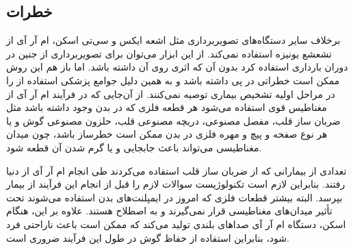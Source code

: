 \subsection{خطرات \mri}
برخلاف سایر دستگاه‌های تصویربرداری مثل اشعه ایکس و سی‌تی اسکن، ام آر آی از تشعشع یونیزه استفاده نمی‌کند. از این ابزار می‌توان برای تصویربرداری از جنین در دوران بارداری استفاده کرد بدون آن که اثری روی آن داشته باشد. اما باز هم این روش ممکن است خطراتی در پی داشته باشد و به همین دلیل جوامع پزشکی استفاده از \mri را در مراحل اولیه تشخیص بیماری توصیه نمی‌کنند. از آن‌جایی که در فرآیند ام آر آی از مغناطیس قوی استفاده می‌شود هر قطعه فلزی که در بدن وجود داشته باشد مثل ضربان ساز قلب، مفصل مصنوعی، دریچه مصنوعی قلب، حلزون مصنوعی گوش و یا هر نوع صفحه و پیچ و مهره فلزی در بدن ممکن است خطرساز باشد، چون میدان مغناطیسی می‌تواند باعث جابجایی و یا گرم شدن آن قطعه شود.

تعدادی از بیمارانی که از ضربان ساز قلب استفاده می‌کردند طی انجام ام آر آی از دنیا رفتند. بنابراین لازم است تکنولوژیست \mri سوالات لازم را قبل از انجام این فرآیند از بیمار بپرسد. البته بیشتر قطعات فلزی که امروز در ایمپلنت‌های بدن استفاده می‌شوند تحت تأثیر میدان‌های مغناطیسی قرار نمی‌گیرند و به اصطلاح
 هستند. علاوه بر این، هنگام اسکن، دستگاه ام آر آی صداهای بلندی تولید می‌کند که ممکن است باعث ناراحتی فرد شود، بنابراین استفاده از حفاظ گوش در طول این فرآیند ضروری است.



